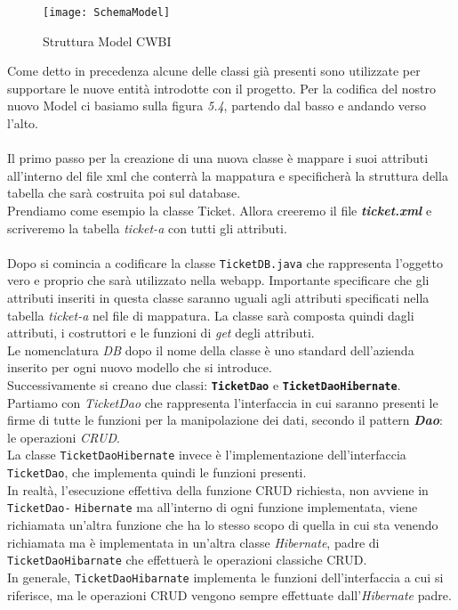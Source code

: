 \begin{figure}[H]
    \centering 
    \texttt{[image: SchemaModel]} 
    \bigskip
    \caption{Struttura Model CWBI}
\end{figure}

\noindent
Come detto in precedenza alcune delle classi già presenti sono utilizzate per supportare le nuove entità introdotte con il progetto. Per la codifica del nostro nuovo Model ci basiamo sulla figura \textit{5.4}, partendo dal basso e andando verso l'alto.  \\
\\
\noindent
Il primo passo per la creazione di una nuova classe è mappare i suoi attributi all'interno del file xml che conterrà la mappatura e specificherà la struttura della tabella che sarà costruita poi sul database. \\
Prendiamo come esempio la classe Ticket. Allora creeremo il file \textit{\textbf{ticket.xml}} e scriveremo la tabella \textit{ticket-a} con tutti gli attributi.\\
\\
\noindent
Dopo si comincia a codificare la classe \texttt{TicketDB.java} che rappresenta l'oggetto vero e proprio che sarà utilizzato nella  webapp. Importante specificare che gli attributi inseriti in questa classe saranno uguali agli attributi specificati nella tabella   \textit{ticket-a} nel file di mappatura. La classe sarà composta quindi dagli attributi, i costruttori e le funzioni di \textit{get} degli attributi.\\
Le nomenclatura \textit{DB} dopo il nome della classe è uno standard dell'azienda inserito per ogni nuovo modello che si introduce.
\\
\noindent
Successivamente si creano due classi: \texttt{\textbf{TicketDao}} e \texttt{\textbf{TicketDaoHibernate}}. \\
Partiamo con \textit{TicketDao} che rappresenta l'interfaccia in cui saranno presenti le firme di tutte le funzioni per la manipolazione dei dati, secondo il pattern \textit{\textbf{Dao}}: le operazioni \textit{CRUD}. \\
La classe \texttt{TicketDaoHibernate} invece è l'implementazione dell'interfaccia \texttt{TicketDao}, che implementa quindi le funzioni presenti. \\
In realtà, l'esecuzione effettiva della funzione CRUD richiesta, non avviene in \texttt{TicketDao-} \texttt{Hibernate} ma all'interno di ogni funzione implementata, viene richiamata un'altra funzione che ha lo stesso scopo di quella in cui sta venendo richiamata ma è implementata in un'altra classe \textit{Hibernate}, padre di \texttt{TicketDaoHibarnate} che 
effettuerà le operazioni classiche CRUD. \\
In generale, \texttt{TicketDaoHibarnate} implementa le funzioni dell'interfaccia a cui si riferisce, ma le operazioni CRUD vengono sempre effettuate dall'\textit{Hibernate} padre.\\

